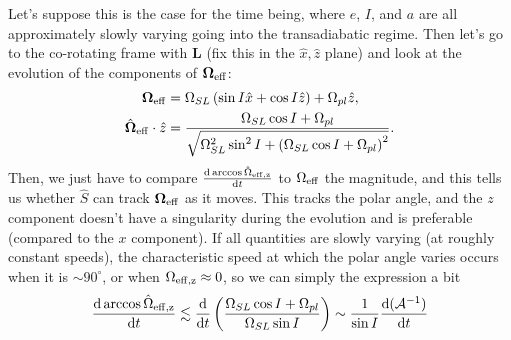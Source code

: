 \documentclass[11pt,
        usenames, %
        dvipsnames %
    ]{article}
\newcommand*{\rd}[2]{\frac{\mathrm{d}#1}{\mathrm{d}#2}}
\newcommand*{\bm}[1]{\boldsymbol{\mathbf{#1}}}
\newcommand*{\p}[1]{\left(#1\right)}
\begin{document}
Let's suppose this is the case for the time being, where $e$, $I$, and $a$ are
all approximately slowly varying going into the transadiabatic regime. Then
let's go to the co-rotating frame with $\bm{L}$ (fix this in the $\hat{x},
\hat{z}$ plane) and look at the evolution of the components of $\bm{\Omega}_{\rm
eff}$:
\begin{align}
    \bm{\Omega}_{\rm eff} &= \Omega_{SL}\p{\sin I \hat{x} + \cos I \hat{z}}
            + \Omega_{pl} \hat{z},\\
    \hat{\bm{\Omega}}_{\rm eff} \cdot \hat{z}
        &= \frac{\Omega_{SL} \cos I + \Omega_{pl}}{
            \sqrt{\Omega_{SL}^2\sin^2 I + \p{\Omega_{SL}\cos I
                + \Omega_{pl}}^2}}.
\end{align}
Then, we just have to compare $\rd{\arccos\hat{\Omega}_{\rm eff, z}}{t}$ to
$\Omega_{\rm eff}$ the magnitude, and this tells us whether $\hat{S}$ can track
$\bm{\Omega}_{\rm eff}$ as it moves. This tracks the polar angle, and the $z$
component doesn't have a singularity during the evolution and is preferable
(compared to the $x$ component). If all quantities are slowly varying (at
roughly constant speeds), the characteristic speed at which the polar angle
varies occurs when it is $\sim 90^\circ$, or when $\Omega_{\rm eff, z} \approx
0$, so we can simply the expression a bit
\begin{equation}
    \rd{\arccos\hat{\Omega}_{\rm eff, z}}{t}
        \lesssim \rd{}{t}\p{\frac{\Omega_{SL} \cos I + \Omega_{pl}}{
            \Omega_{SL}\sin I}} \sim \frac{1}{\sin I}
                \rd{(\mathcal{A}^{-1})}{t}
\end{equation}
\end{document}
